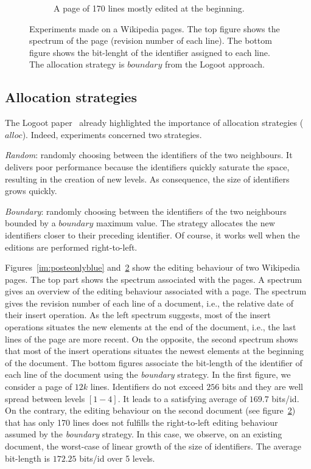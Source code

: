 \begin{figure}
\begin{subfigure}[t]{0.47\textwidth}
\caption{A page of 170 lines mostly edited at the beginning.}
\label{im:didyouknowonlyblue}
\end{subfigure}
\caption{Experiments made on a Wikipedia pages. The top figure shows the
  spectrum of the page (revision number of each line). The bottom figure shows
  the bit-lenght of the identifier assigned to each line. The allocation
  strategy is $boundary$ from the Logoot approach.}
\end{figure}

\subsection{Allocation strategies}
The Logoot paper~\cite{weiss2009logoot} already highlighted the importance of
allocation strategies ($alloc$). Indeed, experiments concerned two strategies.
\begin{inparaenum}[(1)]
\item \emph{Random}: randomly choosing between the identifiers of the two
  neighbours. It delivers poor performance because the identifiers quickly
  saturate the space, resulting in the creation of new levels. As consequence,
  the size of identifiers grows quickly.
\item \emph{Boundary}: randomly choosing between the identifiers of the two
  neighbours bounded by a $boundary$ maximum value. The strategy allocates the
  new identifiers closer to their preceding identifier. Of course, it works
  well when the editions are performed right-to-left.
\end{inparaenum}

Figures~\ref{im:posteonlyblue} and~\ref{im:didyouknowonlyblue} show the editing
behaviour of two Wikipedia pages. The top part shows the spectrum associated
with the pages. A spectrum gives an overview of the editing behaviour
associated with a page. The spectrum gives the revision number of each line of
a document, i.e., the relative date of their insert operation.  As the left
spectrum suggests, most of the insert operations situates the new elements at
the end of the document, i.e., the last lines of the page are more recent. On
the opposite, the second spectrum shows that most of the insert operations
situates the newest elements at the beginning of the document.  The bottom
figures associate the bit-length of the identifier of each line of the document
using the \emph{boundary} strategy. In the first figure, we consider a page of
$12k$ lines. Identifiers do not exceed $256$ bits and they are well spread
between levels $[1-4]$. It leads to a satisfying average of $169.7$ bits/id. On
the contrary, the editing behaviour on the second document (see
figure~\ref{im:didyouknowonlyblue}) that has only 170 lines does not fulfills
the right-to-left editing behaviour assumed by the \emph{boundary} strategy. In
this case, we observe, on an existing document, the worst-case of linear growth
of the size of identifiers.  The average bit-length is $172.25$ bits/id over 5
levels.


